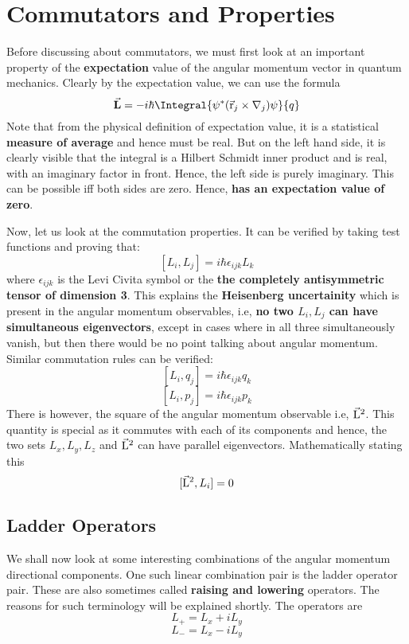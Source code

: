 \documentclass[12pt]{article}
\begin{document}
\section{Commutators and Properties}
Before discussing about commutators, we must first look at an important property of the \textbf{expectation} value of the angular momentum vector in quantum mechanics. Clearly by the expectation value, we can use the formula 
$$\vect{\textbf{L}} = -i\hbar\Integral{\psi^*(\vectcrossvect{\vect{r}_j}{\gradient_j})\psi}{q}$$ Note that from the physical definition of expectation value, it is a statistical \textbf{measure of average} and hence must be real. But on the left hand side, it is clearly visible that the integral is a Hilbert Schmidt inner product and is real, with an imaginary factor in front. Hence, the left side is purely imaginary. This can be possible iff both sides are zero. Hence, \textbf{ has an expectation value of zero}. 

Now, let us look at the commutation properties. It can be verified by taking test functions and proving that:
$$[L_i, L_j] = i\hbar\epsilon_{ijk}L_k$$ where $\epsilon_{ijk}$ is the Levi Civita symbol or the \textbf{the completely antisymmetric tensor of dimension 3}. This explains the \textbf{Heisenberg uncertainity} which is present in the angular momentum observables, i.e, \textbf{no two $L_i, L_j$ can have simultaneous eigenvectors}, except in cases where in all three simultaneously vanish, but then there would be no point talking about angular momentum. Similar commutation rules can be verified:
$$[L_i,q_j] = i\hbar\epsilon_{ijk}q_k$$
$$[L_i,p_j] = i\hbar\epsilon_{ijk}p_k$$
There is however, the square of the angular momentum observable i.e, \textbf{$\vec{\mathrm{L}}^2$}. This quantity is special as it commutes with each of its components and hence, the two sets ${L_x,L_y,L_z}$ and \textbf{$\vec{\mathrm{L}}^2$} can have parallel eigenvectors. Mathematically stating this $$[\vec{\mathrm{L}}^2, L_i] = 0$$

\subsection{Ladder Operators}
We shall now look at some interesting combinations of the angular momentum directional components. One such linear combination pair is the ladder operator pair. These are also sometimes called \textbf{raising and lowering} operators. The reasons for such terminology will be explained shortly. The operators are
$$L_+ = L_x + iL_y$$
$$L_-  = L_x - iL_y$$
\end{document}
